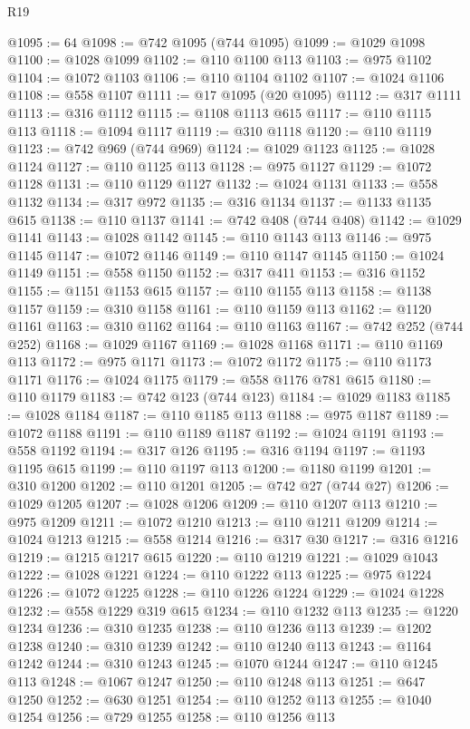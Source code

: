 \begin{lexlean}{R19}
\begin{coremodule}
@1095 := 64
@1098 := @742 @1095 (@744 @1095)
@1099 := @1029 @1098
@1100 := @1028 @1099
@1102 := @110 @1100 @113
@1103 := @975 @1102
@1104 := @1072 @1103
@1106 := @110 @1104 @1102
@1107 := @1024 @1106
@1108 := @558 @1107
@1111 := @17 @1095 (@20 @1095)
@1112 := @317 @1111
@1113 := @316 @1112
@1115 := @1108 @1113 @615
@1117 := @110 @1115 @113
@1118 := @1094 @1117
@1119 := @310 @1118
@1120 := @110 @1119
@1123 := @742 @969 (@744 @969)
@1124 := @1029 @1123
@1125 := @1028 @1124
@1127 := @110 @1125 @113
@1128 := @975 @1127
@1129 := @1072 @1128
@1131 := @110 @1129 @1127
@1132 := @1024 @1131
@1133 := @558 @1132
@1134 := @317 @972
@1135 := @316 @1134
@1137 := @1133 @1135 @615
@1138 := @110 @1137
@1141 := @742 @408 (@744 @408)
@1142 := @1029 @1141
@1143 := @1028 @1142
@1145 := @110 @1143 @113
@1146 := @975 @1145
@1147 := @1072 @1146
@1149 := @110 @1147 @1145
@1150 := @1024 @1149
@1151 := @558 @1150
@1152 := @317 @411
@1153 := @316 @1152
@1155 := @1151 @1153 @615
@1157 := @110 @1155 @113
@1158 := @1138 @1157
@1159 := @310 @1158
@1161 := @110 @1159 @113
@1162 := @1120 @1161
@1163 := @310 @1162
@1164 := @110 @1163
@1167 := @742 @252 (@744 @252)
@1168 := @1029 @1167
@1169 := @1028 @1168
@1171 := @110 @1169 @113
@1172 := @975 @1171
@1173 := @1072 @1172
@1175 := @110 @1173 @1171
@1176 := @1024 @1175
@1179 := @558 @1176 @781 @615
@1180 := @110 @1179
@1183 := @742 @123 (@744 @123)
@1184 := @1029 @1183
@1185 := @1028 @1184
@1187 := @110 @1185 @113
@1188 := @975 @1187
@1189 := @1072 @1188
@1191 := @110 @1189 @1187
@1192 := @1024 @1191
@1193 := @558 @1192
@1194 := @317 @126
@1195 := @316 @1194
@1197 := @1193 @1195 @615
@1199 := @110 @1197 @113
@1200 := @1180 @1199
@1201 := @310 @1200
@1202 := @110 @1201
@1205 := @742 @27 (@744 @27)
@1206 := @1029 @1205
@1207 := @1028 @1206
@1209 := @110 @1207 @113
@1210 := @975 @1209
@1211 := @1072 @1210
@1213 := @110 @1211 @1209
@1214 := @1024 @1213
@1215 := @558 @1214
@1216 := @317 @30
@1217 := @316 @1216
@1219 := @1215 @1217 @615
@1220 := @110 @1219
@1221 := @1029 @1043
@1222 := @1028 @1221
@1224 := @110 @1222 @113
@1225 := @975 @1224
@1226 := @1072 @1225
@1228 := @110 @1226 @1224
@1229 := @1024 @1228
@1232 := @558 @1229 @319 @615
@1234 := @110 @1232 @113
@1235 := @1220 @1234
@1236 := @310 @1235
@1238 := @110 @1236 @113
@1239 := @1202 @1238
@1240 := @310 @1239
@1242 := @110 @1240 @113
@1243 := @1164 @1242
@1244 := @310 @1243
@1245 := @1070 @1244
@1247 := @110 @1245 @113
@1248 := @1067 @1247
@1250 := @110 @1248 @113
@1251 := @647 @1250
@1252 := @630 @1251
@1254 := @110 @1252 @113
@1255 := @1040 @1254
@1256 := @729 @1255
@1258 := @110 @1256 @113

\end{coremodule}
\end{lexlean}
